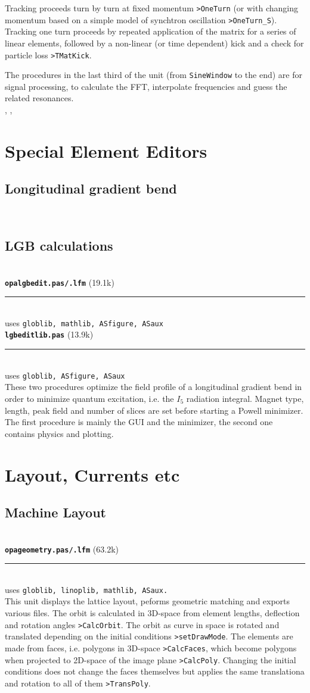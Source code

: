 \documentclass[12pt]{article}
\newcommand\code[1]{{\tt #1}}
\newcommand{\opagui}[1]{\colorbox{blue!20}{{\color{black}\code{#1}}}}
\newcommand{\oguih}[2]{\subsection{\label{#2}#1}{\Huge\opagui{#2}}\\}
\newcommand{\opauni}[1]{\colorbox{orange!30}{{\color{black}\code{#1}}}}
\newcommand{\ounih}[2]{\subsection{\label{#2}#1}{\Huge\opauni{#2}}\\}
\newcommand{\ouni}[1]{\hyperref[#1]{\opauni{#1}}}
\newcommand{\uses}[1]{\flushleft {\bf Uses:} #1}
\newcommand\opamodule[3]{{\bf \tt #1} #2\\  \rule[3pt]{\textwidth}{0.2pt} \\ {\scriptsize uses \tt  #3}\\[1ex]}
\begin{document}
Tracking proceeds turn by turn at fixed momentum \code{>OneTurn} (or with changing momentum based on a simple model of synchtron oscillation \code{>OneTurn\_S}). Tracking one turn proceeds by repeated application of the matrix for a series of linear elements, followed by a non-linear (or time dependent) kick and a check for particle loss \code{>TMatKick}.

The procedures in the last third of the unit (from {\tt SineWindow} to the end) are for signal processing, to calculate the FFT, interpolate frequencies and guess the related resonances.\\


\uses{\ouni{linoplib}, \ouni{elemlib}, \ouni{globlib} \ouni{mathlib}}




\section{\label{secspee}Special Element Editors}


\oguih{Longitudinal gradient bend}{opalgbedit} 




\ounih{LGB calculations}{lgbeditlib} 



\opamodule{opalgbedit.pas/.lfm}{(19.1k)}{globlib,  mathlib, ASfigure, ASaux}
\opamodule{lgbeditlib.pas}{(13.9k)}{globlib, ASfigure, ASaux}
These two procedures optimize the field profile of a longitudinal gradient bend in order to minimize quantum excitation, i.e. the $I_5$ radiation integral. Magnet type, length, peak field and number of slices are set before starting a Powell minimizer. The first procedure is mainly the GUI and the minimizer, the second one contains physics and plotting.


\section{\label{secelse}Layout, Currents etc}

\oguih{Machine Layout}{opageometry}


\opamodule{opageometry.pas/.lfm}{(63.2k)}{globlib, linoplib, mathlib, ASaux.}
This unit displays the lattice layout, peforms geometric matching and exports various files.
The orbit is calculated in 3D-space from element lengths, deflection and rotation angles \code{>CalcOrbit}. The orbit as curve in space is rotated and translated depending on the initial conditions \code{>setDrawMode}.
The elements are made from faces, i.e. polygons in 3D-space \code{>CalcFaces}, which become polygons when projected to 2D-space of the image plane \code{>CalcPoly}. Changing the initial conditions does not change the faces themselves but applies the same translationa and rotation to all of them \code{>TransPoly}.
\end{document}
